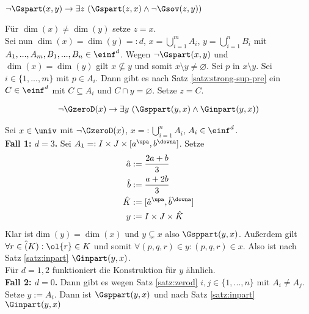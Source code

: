 \begin{erin}
    $\neg\Gspart(x,y) \to \exists z\ (\Gspart(z,x) \wedge \neg\Gsov(z,y))$
\end{erin}

\begin{bew}
    Für $\dim(x) \neq \dim(y)$ setze $z=x$.\\
    Sei nun $\dim(x) = \dim(y) =: d$, $x = \bigcup_{i=1}^m A_i$, $y = \bigcup_{i=1}^n B_i$ mit $A_1, ..., A_m, B_1, ..., B_n \in \einf^d$.
    Wegen $\neg \Gspart(x,y)$ und $\dim(x) = \dim(y)$ gilt $x \nsubseteq y$ und somit $x \setminus y \neq \varnothing$.
    Sei $p$ in $x \setminus y$.
    Sei $i \in \{1, ..., m\}$ mit $p \in A_i$. 
    Dann gibt es nach Satz \ref{satz:strong-sup-pre} ein $C \in \einf^d$ mit $C \subseteq A_i$ und $C \cap y = \varnothing$.
    Setze $z = C$.
\end{bew}


\begin{erin}
    \begin{align*}
        \neg\GzeroD(x) \to \exists y\ (\Gsppart(y,x) \wedge \Ginpart(y,x))
    \end{align*}
\end{erin}

\begin{bew}
    Sei $x \in \univ$ mit $\neg \GzeroD(x)$, $x =: \bigcup_{i=1}^n A_i$, $A_i \in \einf^d$.\\
    \textbf{Fall 1: $d=3$.} Sei $A_1 =: I \times J \times [a^\upa, b^\downa]$. 
    Setze 
    \begin{align*}
        \hat{a} &:= \frac{2a+b}{3}\\
        \hat{b} &:= \frac{a+2b}{3}\\
        \hat{K} &:= [\hat{a}^\upa, \hat{b}^\downa]\\
        y &:= I \times J \times \hat{K}
    \end{align*}
    Klar ist$\dim(y) = \dim(x)$ und $y \subsetneq x$ also $\Gsppart(y,x)$.
    Außerdem gilt $\forall r \in \hat(K) : \ol{r} \in K$ und somit $\forall (p,q,r) \in y : (p,q,r) \in x$.
    Also ist nach Satz \ref{satz:inpart} $\Ginpart(y,x)$.\\
    Für $d=1,2$ funktioniert die Konstruktion für $y$ ähnlich.\\
    \textbf{Fall 2: $d=0$.} 
    Dann gibt es wegen Satz \ref{satz:zerod} $i,j \in \{1, ..., n\}$ mit $A_i \neq A_j$.
    Setze $y := A_i$. 
    Dann ist $\Gsppart(y,x)$ und nach Satz \ref{satz:inpart} $\Ginpart(y,x)$
\end{bew}

